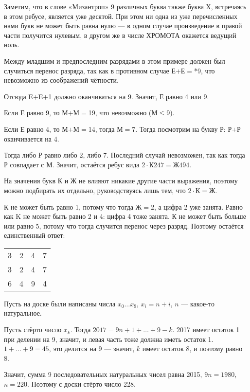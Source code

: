 \begin{itemize}

\itA Заметим, что в слове «Мизантроп» 9 различных букв\scolon а также буква Х, встречаясь в этом ребусе, является уже десятой. При этом ни одна из уже перечисленных нами букв не может быть равна нулю — в одном случае произведение в правой части получится нулевым, в другом же в числе ХРОМОТА окажется ведущий ноль.

\itB Между младшим и предпоследним разрядами в этом примере должен был случиться перенос разряда, так как в противном случае Е$+$Е$=$*9, что невозможно из соображений чётности.

Отсюда E$+$E$+$1 должно оканчиваться на 9. Значит, Е равно 4 или 9.

\subitem Если Е равно 9, то М$+$М$=$19, что невозможно (М$\le$9).

\subitem Если Е равно 4, то М$+$М$=$14, тогда М$=$7. Тогда посмотрим на букву Р: Р$+$Р оканчивается на 4.

Тогда либо Р равно либо 2, либо 7. Последний случай невозможен, так как тогда Р совпадает с М. Значит, остаётся ребус вида $2 \cdot \text{К247} = \text{Ж494}$.

На значения букв К и Ж не влияют никакие другие части выражения, поэтому можно подбирать их отдельно, руководствуясь лишь тем, что $2 \cdot \text{К} = \text{Ж}$.

К не может быть равно 1, потому что тогда $\text{Ж} = 2$, а цифра 2 уже занята. Равно как K не может быть равно 2 и 4: цифра 4 тоже занята. К не может быть больше или равно 5, потому что тогда случится перенос через разряд. Поэтому остаётся единственный ответ:

\begin{center} \begin{tabular}{cccc}
	3 & 2 & 4 & 7 \\
	3 & 2 & 4 & 7 \\ \hline
	6 & 4 & 9 & 4
\end{tabular} \end{center}

\itC Пусть на доске были написаны числа $x_0 \ldots x_9$, $x_i = n+i$, $n$ — какое-то натуральное.

Пусть стёрто число $x_k$. Тогда $2017 = 9n+ 1 + \ldots + 9 - k$. 2017 имеет остаток 1 при делении на 9, значит, и левая часть тоже должна иметь остаток 1. $1 + \ldots + 9 = 45$, это делится на 9 — значит, $k$ имеет остаток 8, и поэтому равно 8.

Значит, сумма 9 последовательных натуральных чисел равна 2015, $9n = 1980$, $n=220$. Поэтому с доски стёрто число 228.
\end{itemize}